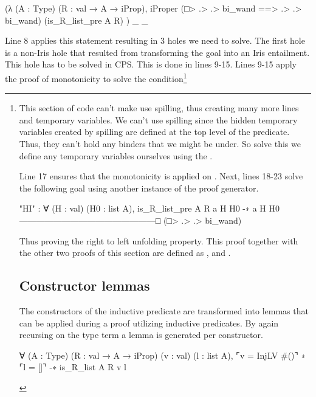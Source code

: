 \documentclass[thesis.tex]{subfiles}
\begin{document}
\begin{coqcode}
  (λ (A : Type) (R : val → A → iProp),
    iProper (□> .> .> bi_wand ==> .> .> bi_wand) 
            (is_R_list_pre A R)
  ) _ _
\end{coqcode}
Line 8 applies this statement resulting in 3 holes we need to solve. The first hole is a non-Iris hole that resulted from transforming the goal into an Iris entailment. This hole has to be solved in CPS. This is done in lines 9-15. Lines 9-15 apply the proof of monotonicity to solve the  condition\footnote{This section of code can't make use spilling, thus creating many more lines and temporary variables. We can't use spilling since the hidden temporary variables created by spilling are defined at the top level of the predicate. Thus, they can't hold any binders that we might be under. So solve this we define any temporary variables ourselves using the .

Line 17 ensures that the monotonicity is applied on . Next, lines 18-23 solve the following goal using another instance of the  proof generator.
\begin{coqcode}
  "HI" : ∀ (H : val) (H0 : list A), 
          is_R_list_pre A R a H H0 -∗ a H H0
  ------------------------------------------------□
  (□> .> .> bi_wand)%
\end{coqcode}
Thus proving the right to left unfolding property. This proof together with the other two proofs of this section are defined as ,  and .

\section{Constructor lemmas}\label{sec:constrconstr}
The constructors of the inductive predicate are transformed into lemmas that can be applied during a proof utilizing inductive predicates. By again recursing on the type term a lemma is generated per constructor.
\begin{coqcode}
  ∀ (A : Type) (R : val → A → iProp) 
    (v : val) (l : list A),
    ⌜v = InjLV #()⌝ ∗ ⌜l = []⌝ -∗ is_R_list A R v l


\end{coqcode}}
\end{document}

